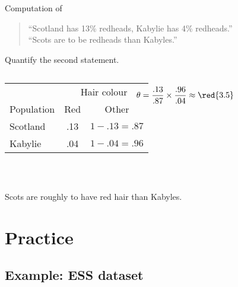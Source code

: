 \documentclass[t]{beamer}
\begin{document}
	\begin{frame}[t]{Computation of }
					
		\begin{quote}
		``Scotland has 13\% redheads, Kabylie has 4\% redheads.''\\
		``Scots are  to be redheads than Kabyles.''
		\end{quote}
		
		Quantify the second statement.
		
		\begin{columns}[t]
		\vspace{-.5em}
    \begin{center}
    \begin{tabular}{lcc}
      \toprule
      & \multicolumn{2}{c}{Hair colour} \\
      \cmidrule(r){2-3}
      Population & Red & Other \\
      \midrule
      Scotland & .13 & $1-.13=.87$\\
      Kabylie & .04 & $1-.04=.96$ \\
      \bottomrule
    \end{tabular}\\[0em]
  \end{center}
		
	\vspace{3.275em}	
	$$\hspace{-3em}\theta = \frac{.13}{.87}\times\frac{.96}{.04}\approx\red{3.5}$$
	\end{columns}
	
	\vspace{1.5em}
	Scots are roughly  to have red hair than Kabyles.%
		
	\end{frame}	

	\section{Practice}

	\subsection{Example: ESS dataset}
	
\end{document}
